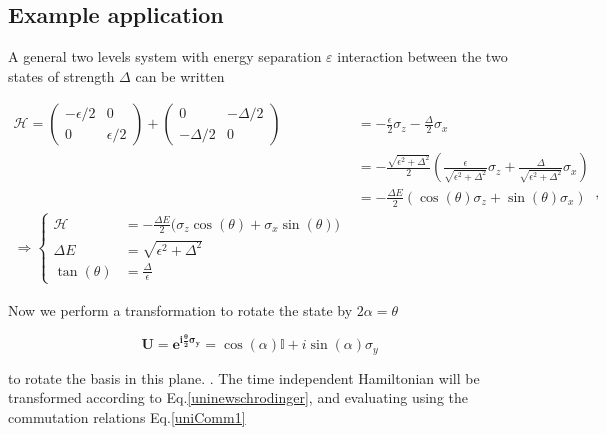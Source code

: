  \subsection{Example application\label{subsec:ExampleApplication}}
  A general two levels system with energy separation $ \varepsilon $ interaction between the two states of strength $ \Delta $ can be written
  
     \begin{equation}
  \label{l1-uni}
  \begin{aligned}
  \mathcal{H} = \left(\begin{matrix}
  -\epsilon/2 & 0\\ 0 & \epsilon/2
  \end{matrix}\right) + \begin{pmatrix}
  0 & -\Delta/2\\-\Delta/2 & 0
  \end{pmatrix} & = {-\frac{\epsilon}{2}\sigma_z-\frac{\Delta}{2}\sigma_x}\\
  & = -\frac{\sqrt{\epsilon^2+\Delta^2}}{2}\left(\frac{\epsilon}{\sqrt{\epsilon^2+\Delta^2}}\sigma_z+\frac{\Delta}{\sqrt{\epsilon^2+\Delta^2}}\sigma_x\right)\\
  & = -\frac{\Delta E}{2}\left(\cos\left(\theta\right)\sigma_z+\sin\left(\theta\right)\sigma_x\right)\\
  {\Rightarrow \left\lbrace\begin{aligned}
  	\mathcal{H} & = -\frac{\Delta E}{2}\big(\sigma_z\cos(\theta)+\sigma_x\sin(\theta)\big)\\
  	\Delta E & = \sqrt{\epsilon^2+\Delta^2}\\
  	\tan(\theta) & = \frac{\Delta}{\epsilon}
  	\end{aligned}\right.} 
  \end{aligned},
  \end{equation}
  
  \begin{figure}[h]
  \end{figure}

  \noindent Now we perform a transformation to rotate the state by $ 2\alpha = \theta $
  
  \begin{equation}\label{unitary1}
   \mathbf{U=e^{i\frac{\theta}{2}\sigma_y}} =  \cos(\alpha)\mathbb{I}+i\sin(\alpha)\sigma_y
  \end{equation}
  
  \noindent to rotate the basis in this plane. . The {time independent Hamiltonian} will be transformed according to Eq.\eqref{uninewschrodinger}, and evaluating using the commutation relations Eq.\eqref{uniComm1}
  
